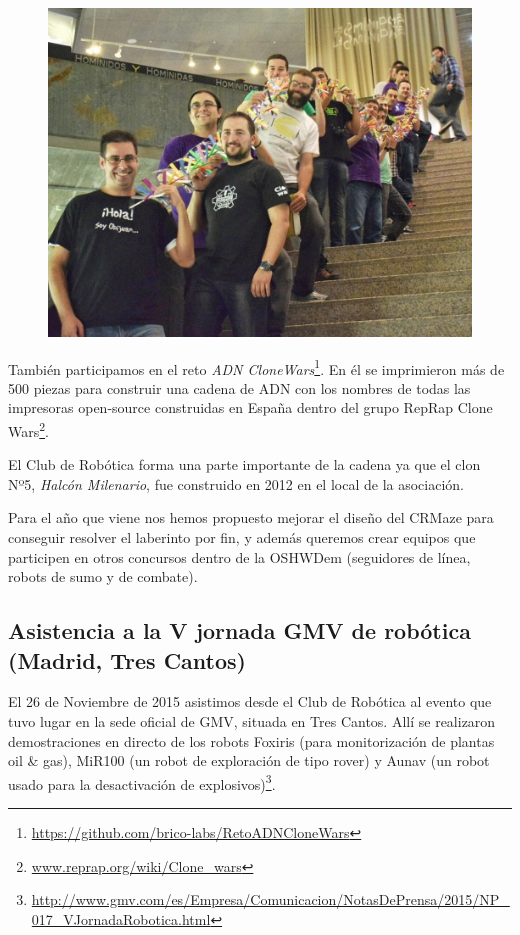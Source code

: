 \documentclass[12pt,twoside]{report}
\begin{document}
\begin{figure}\centering
    \includegraphics[scale=0.2]{fotos/2015_OSHWDem_cadenaADNcloneWars}
    \caption*{}
\end{figure}
También participamos en el reto \emph{ADN CloneWars}\footnote{\url{https://github.com/brico-labs/RetoADNCloneWars}}. En él se imprimieron más de 500 piezas para construir una cadena de ADN con los nombres de todas las impresoras open-source construidas en España dentro del grupo RepRap Clone Wars\footnote{\url{www.reprap.org/wiki/Clone_wars}}.

El Club de Robótica forma una parte importante de la cadena ya que el clon Nº5, \emph{Halcón Milenario}, fue construido en 2012 en el local de la asociación.

Para el año que viene nos hemos propuesto mejorar el diseño del CRMaze para conseguir resolver el laberinto por fin, y además queremos crear equipos que participen en otros concursos dentro de la OSHWDem (seguidores de línea, robots de sumo y de combate).





\subsection{Asistencia a la V jornada GMV de robótica (Madrid, Tres Cantos)}


El 26 de Noviembre de 2015 asistimos desde el Club de Robótica al evento que tuvo lugar en la sede oficial de GMV, situada en Tres Cantos. Allí se realizaron demostraciones en directo de los robots Foxiris (para monitorización de plantas oil \& gas), MiR100 (un robot de exploración de tipo rover) y Aunav (un robot usado para la desactivación de explosivos)\footnote{\tiny\url{http://www.gmv.com/es/Empresa/Comunicacion/NotasDePrensa/2015/NP_017_VJornadaRobotica.html}}.
\end{document}
